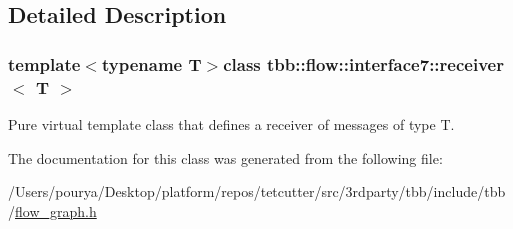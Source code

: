 \subsection{Detailed Description}
\subsubsection*{template$<$typename T$>$class tbb\+::flow\+::interface7\+::receiver$<$ T $>$}

Pure virtual template class that defines a receiver of messages of type T. 

The documentation for this class was generated from the following file\+:\begin{DoxyCompactItemize}
\item 
/\+Users/pourya/\+Desktop/platform/repos/tetcutter/src/3rdparty/tbb/include/tbb/\hyperlink{flow__graph_8h}{flow\+\_\+graph.\+h}\end{DoxyCompactItemize}
